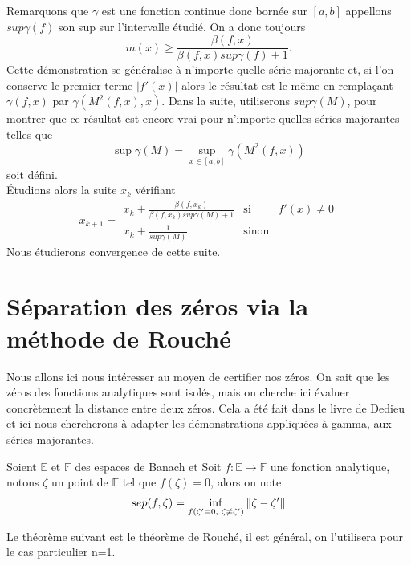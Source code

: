 \documentclass[a4paper,10.5pt]{article}
\begin{document}
	\vspace{7mm}
	Remarquons que $\gamma$ est une fonction continue donc bornée sur $[a,b]$ appellons $sup\gamma(f)$ son sup sur l'intervalle étudié. On a donc toujours
	\[m(x)\geq\frac{\beta(f,x)}{\beta(f,x)sup\gamma(f)+1}.\]
    Cette démonstration se généralise à n'importe quelle série majorante et, si l'on conserve le premier terme $|f'(x)|$ alors le résultat est le même en remplaçant $\gamma(f,x)$ par $\gamma(M^2(f,x),x)$. Dans la suite, utiliserons $sup\gamma(M)$, pour montrer que ce résultat est encore vrai pour n'importe quelles séries majorantes telles que 
    \[\sup\gamma(M)=\sup_{x\in[a,b]}\gamma(M^2(f,x)) \]
    soit défini.
    \\
    Étudions alors la suite $x_k$ vérifiant 
    \begin{equation}
    x_{k+1}=
    \begin{array}{ccc}
    x_k+\frac{\beta(f,x_k)}{\beta(f,x_k)sup\gamma(M)+1} & \mbox{si} & f'(x)\neq 0\\
    x_k+\frac{1}{sup\gamma(M)} & \mbox{sinon}
    \end{array}
    \end{equation}
    Nous étudierons convergence de cette suite. 
	
	
	\section{Séparation des zéros via la méthode de Rouché}
	Nous allons ici nous intéresser au moyen de certifier nos zéros. On sait que les zéros des fonctions analytiques sont isolés, mais on cherche ici évaluer concrètement la distance entre deux zéros. Cela a été fait dans le livre de Dedieu et ici nous chercherons à adapter les démonstrations appliquées à gamma, aux séries majorantes.
	
	\begin{definition} Soient $\mathbb{E}$ et $\mathbb{F}$ des espaces de Banach et 
		Soit $f:\mathbb{E}\rightarrow \mathbb{F}$ une fonction analytique, notons $\zeta$ un point de $\mathbb{E}$ tel que $f(\zeta)=0$, alors on note
		\begin{equation}
		 sep(f,\zeta)=\inf_{f(\zeta '=0, \hspace{1mm} \zeta \neq \zeta ')}\left\|\zeta-\zeta '\right\|
		\end{equation}
		
	\end{definition}
	
	Le théorème suivant est le théorème de Rouché, il est général, on l'utilisera pour le cas particulier n=1.
\end{document}
